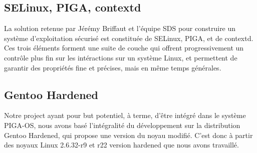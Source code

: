 \subsection{SELinux, PIGA, contextd}

La solution retenue par Jérémy Briffaut et l'équipe SDS pour construire un système d'exploitation sécurisé est constituée de SELinux, PIGA, et de contextd. Ces trois éléments forment une suite de couche qui offrent progressivement un contrôle plus fin sur les intéractions sur un système Linux, et permettent de garantir des propriétés fine et précises, mais en même temps générales.

\subsection{Gentoo Hardened}

Notre project ayant pour but potentiel, à terme, d'être intégré dans le système PIGA-OS, nous avons basé l'intégralité du développement sur la distribution Gentoo Hardened, qui propose une version du noyau modifié. C'est donc à partir des noyaux Linux 2.6.32-r9 et r22 version hardened que nous avons travaillé.

